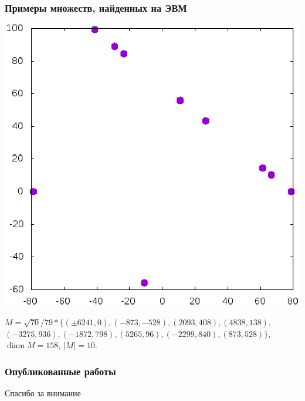 \documentclass[10pt,pdf,hyperref={unicode}]{beamer}
\theoremstyle{definition}
\begin{document}
\begin{frame}
	\frametitle{Примеры множеств, найденных на ЭВМ~\cite{our-ped-2018}}

		\center
		\includegraphics[width=0.6\linewidth]{Avdeev_10_158_1538485325776.eps}

			$
			M = \sqrt{70}/79 *
			\{
			( \pm6241 , 0),
			( -873 , -528),
			( 2093 , 408),
			( 4838 , 138),
			$ $
			( -3275 , 936),
			( -1872 , 798),
			( 5265 , 96),
			( -2299 , 840),
			( 873 , 528)
			\}
			$,
			$\operatorname{diam} M = 158$,
			$|M| = 10$.



\end{frame}



\begin{frame}
	\frametitle{Опубликованные работы}
	\printbibliography{}
\end{frame}

\begin{frame}
	\huge\centering
	Спасибо за внимание
\end{frame}
\end{document}

